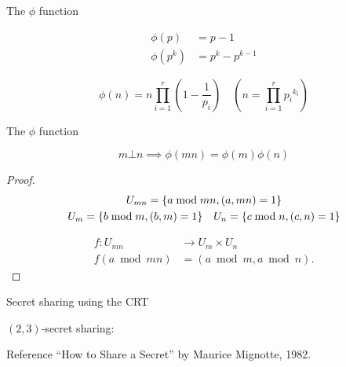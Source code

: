 \begin{frame}{The $\phi$ function}
  \begin{theorem}
	\begin{align*}
	  \phi(p) &= p - 1 \\
	  \phi(p^k) &= p^k - p^{k-1}
	\end{align*}
  \end{theorem}

  \pause
  \[
	\phi(n) = n \prod_{i=1}^{r} (1 - \frac{1}{p_i}) \quad (n = \prod_{i=1}^{r} {p_i}^{k_i})
  \]

  \begin{quote}
  \end{quote}


\end{frame}
\begin{frame}{The $\phi$ function}
  \begin{theorem}
	\[
	  m \bot n \implies \phi(mn) = \phi(m) \phi(n)
	\]
  \end{theorem}

  \pause
  \begin{proof}
	\begin{gather*}
	  U_{mn} = \{a \bmod mn, (a, mn) = 1\} \\
	  U_{m} = \{b \bmod m, (b,m) = 1\} \quad U_{n} = \{c \bmod n, (c,n) = 1\}
	\end{gather*}

	\pause
	\begin{align*}
	  f: U_{mn} &\to U_m \times U_n \\
	  f(a \bmod mn) &= (a \bmod m, a \bmod n).
	\end{align*}
  \end{proof}
\end{frame}
\begin{frame}{Secret sharing using the CRT}
  \begin{definition}
	$(2,3)$-secret sharing:
  \end{definition}

  \pause
  \begin{alertblock}{Reference}
	``How to Share a Secret'' by Maurice Mignotte, 1982.
  \end{alertblock}
\end{frame}
